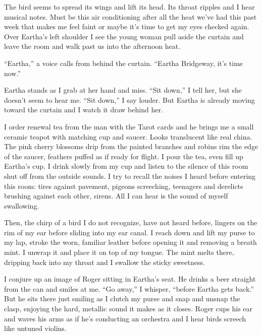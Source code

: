 \documentclass[twoside,10pt]{book}
\begin{document}
The bird seems to spread its wings and lift its head. Its throat ripples
and I hear musical notes. Must be this air conditioning after all the
heat we've had this past week that makes me feel faint or maybe it's
time to get my eyes checked again. Over Eartha's left shoulder I see the
young woman pull aside the curtain and leave the room and walk past us
into the afternoon heat.

``Eartha,'' a voice calls from behind the curtain. ``Eartha Bridgeway,
it's time now.''

Eartha stands as I grab at her hand and miss. ``Sit down,'' I tell her,
but she doesn't seem to hear me. ``Sit down,'' I say louder. But Eartha
is already moving toward the curtain and I watch it draw behind her.

I order renewal tea from the man with the Tarot cards and he brings me a
small ceramic tea­pot with matching cup and saucer. Looks translucent
like real china. The pink cherry blossoms drip from the painted branches
and robins rim the edge of the saucer, feathers puffed as if ready for
flight. I pour the tea, even fill up Eartha's cup. I drink slowly from
my cup and listen to the silence of this room shut off from the outside
sounds. I try to recall the noises I heard before entering this room:
tires against pavement, pigeons screeching, teenagers and derelicts
brushing against each other, sirens. All I can hear is the sound of
myself swallowing.

Then, the chirp of a bird I do not recognize, have not heard before,
lingers on the rim of my ear before sliding into my ear canal. I reach
down and lift my purse to my lap, stroke the worn, famil­iar leather
before opening it and removing a breath mint. I unwrap it and place it
on top of my tongue. The mint melts there, dripping back into my throat
and I swallow the sticky sweetness.

I conjure up an image of Roger sitting in Eartha's seat. He drinks a
beer straight from the can and smiles at me. ``Go away,'' I whisper,
``before Eartha gets back.'' But he sits there just smiling as I clutch
my purse and snap and unsnap the clasp, enjoying the hard, metallic
sound it makes as it closes. Roger cups his ear and waves his arms as if
he's conducting an orchestra and I hear birds screech like untuned
violins.
\end{document}
